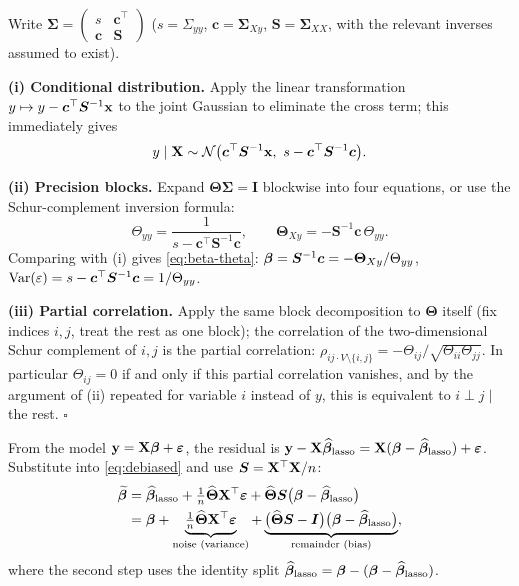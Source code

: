 \begin{description}[style=nextline, itemsep=1.2ex]
\item[Exercise \ref{ex:block-inv} (the block-inversion trilogy)]
Write $\bm{\Sigma} = \begin{pmatrix} s & \bm{c}^\top \\ \bm{c} & \bm{S} \end{pmatrix}$ ($s = \Sigma_{yy}$, $\bm{c} = \bm{\Sigma}_{Xy}$, $\bm{S} = \bm{\Sigma}_{XX}$, with the relevant inverses assumed to exist).

\textbf{(i) Conditional distribution.} Apply the linear transformation $y \mapsto y - \bm{c}^\top\bm{S}^{-1}\mathbf{x}$ to the joint Gaussian to eliminate the cross term; this immediately gives
\[
  y \mid \mathbf{X} \sim \mathcal{N}\big( \bm{c}^\top\bm{S}^{-1}\mathbf{x},\ s - \bm{c}^\top\bm{S}^{-1}\bm{c} \big).
\]

\textbf{(ii) Precision blocks.} Expand $\bm{\Theta}\bm{\Sigma} = \bm{I}$ blockwise into four equations, or use the Schur-complement inversion formula:
\[
  \Theta_{yy} = \frac{1}{s - \bm{c}^\top\bm{S}^{-1}\bm{c}}, \qquad
  \bm{\Theta}_{Xy} = -\bm{S}^{-1}\bm{c}\,\Theta_{yy}.
\]
Comparing with (i) gives \eqref{eq:beta-theta}: $\bm{\beta} = \bm{S}^{-1}\bm{c} = -\bm{\Theta}_{Xy}/\Theta_{yy}$, $\mathrm{Var}(\varepsilon) = s - \bm{c}^\top\bm{S}^{-1}\bm{c} = 1/\Theta_{yy}$.

\textbf{(iii) Partial correlation.} Apply the same block decomposition to $\bm{\Theta}$ itself (fix indices $i, j$, treat the rest as one block); the correlation of the two-dimensional Schur complement of $i,j$ is the partial correlation:
$\rho_{ij\cdot V\setminus\{i,j\}} = -\Theta_{ij}/\sqrt{\Theta_{ii}\Theta_{jj}}$.
In particular $\Theta_{ij} = 0$ if and only if this partial correlation vanishes, and by the argument of (ii) repeated for variable $i$ instead of $y$, this is equivalent to $i \perp j \mid$ the rest. $\square$

\item[Exercise \ref{ex:debiased} (error decomposition of the debiased estimator)]
From the model $\mathbf{y} = \mathbf{X}\bm{\beta} + \bm{\varepsilon}$, the residual is $\mathbf{y} - \mathbf{X}\widehat{\bm{\beta}}_{\mathrm{lasso}} = \mathbf{X}(\bm{\beta} - \widehat{\bm{\beta}}_{\mathrm{lasso}}) + \bm{\varepsilon}$. Substitute into \eqref{eq:debiased} and use $\bm{S} = \mathbf{X}^\top\mathbf{X}/n$:
\begin{align*}
  \widetilde{\bm{\beta}}
  &= \widehat{\bm{\beta}}_{\mathrm{lasso}} + \tfrac{1}{n}\widehat{\bm{\Theta}}\mathbf{X}^\top\bm{\varepsilon} + \widehat{\bm{\Theta}}\bm{S}\big(\bm{\beta} - \widehat{\bm{\beta}}_{\mathrm{lasso}}\big) \\
  &= \bm{\beta} + \underbrace{\tfrac{1}{n}\widehat{\bm{\Theta}}\mathbf{X}^\top\bm{\varepsilon}}_{\text{noise (variance)}} + \underbrace{\big(\widehat{\bm{\Theta}}\bm{S} - \bm{I}\big)\big(\bm{\beta} - \widehat{\bm{\beta}}_{\mathrm{lasso}}\big)}_{\text{remainder (bias)}},
\end{align*}
where the second step uses the identity split $\widehat{\bm{\beta}}_{\mathrm{lasso}} = \bm{\beta} - (\bm{\beta} - \widehat{\bm{\beta}}_{\mathrm{lasso}})$.


\end{description}
